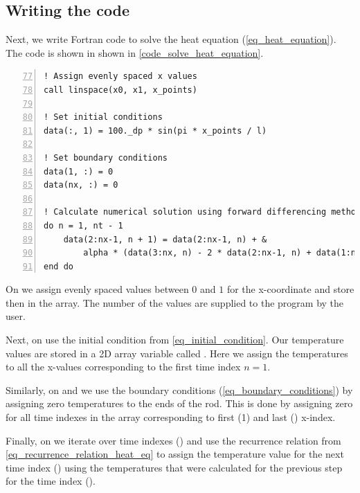 \subsection{Writing the code}

Next, we write Fortran code to solve the heat equation (\autoref{eq_heat_equation}). The code is shown in shown in \autoref{code_solve_heat_equation}.


\noindent\begin{minipage}{\linewidth}
\begin{lstlisting}[caption={Solving a heat equation with forward-difference method (\code{heat\_equation.f90}).},frame=tlrb,label={code_solve_heat_equation}, numbers=left, firstnumber=77]
! Assign evenly spaced x values
call linspace(x0, x1, x_points)

! Set initial conditions
data(:, 1) = 100._dp * sin(pi * x_points / l)

! Set boundary conditions
data(1, :) = 0
data(nx, :) = 0

! Calculate numerical solution using forward differencing method
do n = 1, nt - 1
    data(2:nx-1, n + 1) = data(2:nx-1, n) + &
        alpha * (data(3:nx, n) - 2 * data(2:nx-1, n) + data(1:nx-2, n))
end do
\end{lstlisting}
\end{minipage}

On  we assign evenly spaced values between $0$ and $1$ for the x-coordinate and store then in the  array. The number of the values  are supplied to the program by the user.

Next, on  use the initial condition from \autoref{eq_initial_condition}. Our temperature values are stored in a 2D array variable called . Here we assign the temperatures to all the x-values corresponding to the first time index $n=1$.

Similarly, on  and  we use the boundary conditions (\autoref{eq_boundary_conditions}) by assigning zero temperatures to the ends of the rod. This is done by assigning zero for all time indexes in the  array corresponding to first (1) and last () x-index.

Finally, on  we iterate over time indexes () and use the recurrence relation from \autoref{eq_recurrence_relation_heat_eq} to assign the temperature value for the next time index () using the temperatures that were calculated for the previous step for the time index ().

